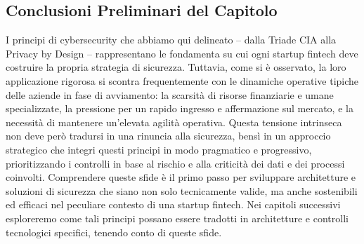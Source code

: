 \subsection{Conclusioni Preliminari del Capitolo}
I principi di cybersecurity che abbiamo qui delineato – dalla Triade CIA alla Privacy by Design – rappresentano le fondamenta su cui ogni startup fintech deve costruire la propria strategia di sicurezza. Tuttavia, come si è osservato, la loro applicazione rigorosa si scontra frequentemente con le dinamiche operative tipiche delle aziende in fase di avviamento: la scarsità di risorse finanziarie e umane specializzate, la pressione per un rapido ingresso e affermazione sul mercato, e la necessità di mantenere un'elevata agilità operativa.
Questa tensione intrinseca non deve però tradursi in una rinuncia alla sicurezza, bensì in un approccio strategico che integri questi principi in modo pragmatico e progressivo, prioritizzando i controlli in base al rischio e alla criticità dei dati e dei processi coinvolti. Comprendere queste sfide è il primo passo per sviluppare architetture e soluzioni di sicurezza che siano non solo tecnicamente valide, ma anche sostenibili ed efficaci nel peculiare contesto di una startup fintech. Nei capitoli successivi esploreremo come tali principi possano essere tradotti in architetture e controlli tecnologici specifici, tenendo conto di queste sfide.